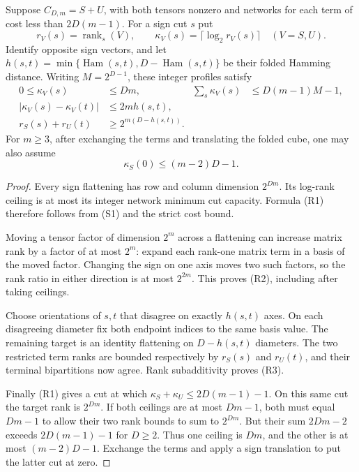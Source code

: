 \begin{lemma}
\label{lem:folded-rank-profiles}
Suppose $C_{D,m}=S+U$, with both tensors nonzero and networks
for each term of cost less than $2D(m-1)$.  For a sign cut $s$
put
\[
 r_V(s)=\operatorname{rank}_s(V),\qquad
 \kappa_V(s)=\lceil\log_2r_V(s)\rceil
 \quad(V=S,U).
\]
Identify opposite sign vectors, and let
$h(s,t)=\min\{\operatorname{Ham}(s,t),
D-\operatorname{Ham}(s,t)\}$ be their folded Hamming distance.
Writing $M=2^{D-1}$, these integer profiles satisfy
\begin{align}
 0\le\kappa_V(s)&\le Dm,&
 \sum_s\kappa_V(s)&\le D(m-1)M-1,                 \tag{R1}\\
 |\kappa_V(s)-\kappa_V(t)|&\le2m h(s,t),          \tag{R2}\\
 r_S(s)+r_U(t)&\ge2^{m(D-h(s,t))}.               \tag{R3}
\end{align}
For $m\ge3$, after exchanging the terms and translating
the folded cube, one may also assume
\[
 \kappa_S(0)\le(m-2)D-1.                         \tag{R4}
\]
\end{lemma}
\begin{proof}
Every sign flattening has row and column dimension $2^{Dm}$.
Its log-rank ceiling is at most its integer network minimum
cut capacity.  Formula (R1) therefore follows from (S1) and
the strict cost bound.

Moving a tensor factor of dimension $2^m$ across a flattening
can increase matrix rank by a factor of at most $2^m$:
expand each rank-one matrix term in a basis of the moved
factor.  Changing the sign on one axis moves two such factors,
so the rank ratio in either direction is at most $2^{2m}$.
This proves (R2), including after taking ceilings.

Choose orientations of $s,t$ that disagree on exactly $h(s,t)$
axes.  On each disagreeing diameter fix both endpoint indices
to the same basis value.  The remaining target is an identity
flattening on $D-h(s,t)$ diameters.  The two restricted term
ranks are bounded respectively by $r_S(s)$ and $r_U(t)$,
and their terminal bipartitions now agree.  Rank subadditivity
proves (R3).

Finally (R1) gives a cut at which
$\kappa_S+\kappa_U\le2D(m-1)-1$.  On this same cut the
target rank is $2^{Dm}$.  If both ceilings are at most $Dm-1$,
both must equal $Dm-1$ to allow their two rank bounds to sum
to $2^{Dm}$.  But their sum $2Dm-2$ exceeds
$2D(m-1)-1$ for $D\ge2$.  Thus one ceiling is $Dm$,
and the other is at most $(m-2)D-1$.  Exchange the terms
and apply a sign translation to put the latter cut at zero.
\end{proof}

